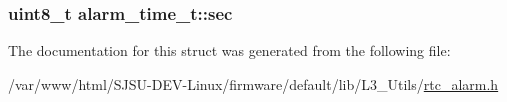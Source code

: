 \subsubsection[{\texorpdfstring{sec}{sec}}]{\setlength{\rightskip}{0pt plus 5cm}uint8\+\_\+t alarm\+\_\+time\+\_\+t\+::sec}\hypertarget{structalarm__time__t_acee0c4e36d57b97fc128d666147961e6}{}\label{structalarm__time__t_acee0c4e36d57b97fc128d666147961e6}


The documentation for this struct was generated from the following file\+:\begin{DoxyCompactItemize}
\item 
/var/www/html/\+S\+J\+S\+U-\/\+D\+E\+V-\/\+Linux/firmware/default/lib/\+L3\+\_\+\+Utils/\hyperlink{rtc__alarm_8h}{rtc\+\_\+alarm.\+h}\end{DoxyCompactItemize}
